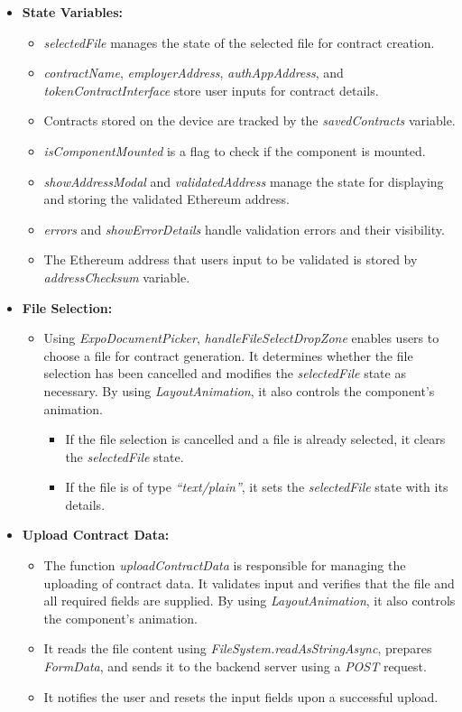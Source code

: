 \begin{itemize}
    \item \textbf{State Variables:}
    \begin{itemize}
        \item \textit{selectedFile} manages the state of the selected file for contract creation.
        \item \textit{contractName}, \textit{employerAddress}, \textit{authAppAddress}, and \textit{tokenContractInterface} store user inputs for contract details.
        \item Contracts stored on the device are tracked by the \textit{savedContracts} variable.
        \item \textit{isComponentMounted} is a flag to check if the component is mounted.
        \item \textit{showAddressModal} and \textit{validatedAddress} manage the state for displaying and storing the validated Ethereum address.
        \item \textit{errors} and \textit{showErrorDetails} handle validation errors and their visibility.
        \item The Ethereum address that users input to be validated is stored by \textit{addressChecksum} variable.
    \end{itemize}

    \item \textbf{File Selection:}
    \begin{itemize}
        \item Using \textit{ExpoDocumentPicker}, \textit{handleFileSelectDropZone} enables users to choose a file for contract generation. It determines whether the file selection has been cancelled and modifies the \textit{selectedFile} state as necessary. By using \textit{LayoutAnimation}, it also controls the component's animation.
        \begin{itemize}
            \item If the file selection is cancelled and a file is already selected, it clears the \textit{selectedFile} state.
            \item If the file is of type \textit{``text/plain''}, it sets the \textit{selectedFile} state with its details.
        \end{itemize}
    \end{itemize}

    \item \textbf{Upload Contract Data:}
    \begin{itemize}
        \item The function \textit{uploadContractData} is responsible for managing the uploading of contract data. It validates input and verifies that the file and all required fields are supplied. By using \textit{LayoutAnimation}, it also controls the component's animation.
        \item It reads the file content using \textit{FileSystem.readAsStringAsync}, prepares \textit{FormData}, and sends it to the backend server using a \textit{POST} request.
        \item It notifies the user and resets the input fields upon a successful upload.
    \end{itemize}


\end{itemize}
